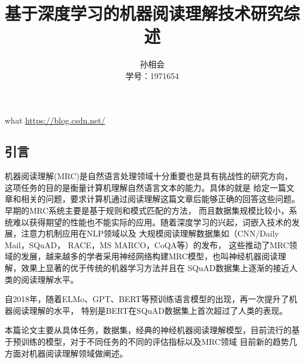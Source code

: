 \documentclass{article}
\title{\heiti \zihao{2} 基于深度学习的机器阅读理解技术研究综述}%
\author{\kaishu \zihao{-4} 孙相会\\
\songti \zihao{-5} 学号：1971654}%
\date{}
\begin{document}
    \maketitle %

        
    what
    \url{https://blog.csdn.net/
    }
\begin{multicols}{2}
    \section{引言}

机器阅读理解(MRC)是自然语言处理领域十分重要也是具有挑战性的研究方向，这项任务的目的是衡量计算机理解自然语言文本的能力。具体的就是
给定一篇文章和相关的问题，要求计算机通过阅读理解这篇文章后能够正确的回答这些问题。早期的MRC系统主要是基于规则和模式匹配的方法，
而且数据集规模比较小，系统难以获得期望的性能也不能实际的应用。随着深度学习的兴起，词嵌入技术的发展，注意力机制应用在NLP领域\cite{neural machine translation by jointly learning to align and translate}以及
大规模阅读理解数据集如（CNN/Daily Mail\cite{Teaching Machines to Read and Comprehend}，SQuAD\cite{SQuAD1}，
RACE\cite{RACE}，MS MARCO\cite{MS marco}，CoQA\cite{CoQA}等）的发布，
这些推动了MRC领域的发展，越来越多的学者采用神经网络构建MRC模型，也叫神经机器阅读理解，效果上显著的优于传统的机器学习方法并且在
SQuAD\cite{SQuAD1}数据集上逐渐的接近人类的阅读理解水平。

自2018年，随着ELMo\cite{ELMo}、GPT\cite{GPT}、BERT\cite{BERT}等预训练语言模型的出现，再一次提升了机器阅读理解的水平，
特别是BERT\cite{BERT}在SQuAD数据集上首次超过了人类的表现。

本篇论文主要从具体任务，数据集，经典的神经机器阅读理解模型，目前流行的基于预训练的模型，对于不同任务的不同的评估指标以及MRC领域
目前新的趋势几方面对机器阅读理解领域做阐述。

\end{multicols}
%


        
\end{document}
